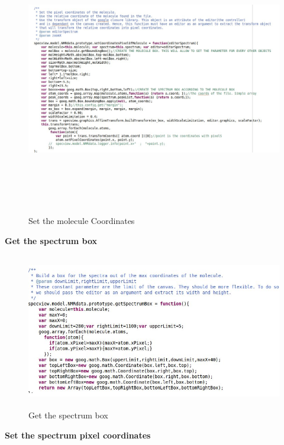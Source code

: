     \begin{figure}[h]
    \begin{centering}
    \caption{Set the molecule Coordinates}
\includegraphics[width=195mm,height=120mm]{./images/setMoleculeCoordinates}
    \end{centering}
    \end{figure}
\clearpage
\textbf{Get the spectrum box}
    \begin{figure}[h]
    \begin{centering}
    \caption{Get the spectrum box}
\includegraphics[width=155mm,height=68mm]{./images/getSpecBox}
    \end{centering}
    \end{figure}
\textbf{Set the spectrum pixel coordinates}
